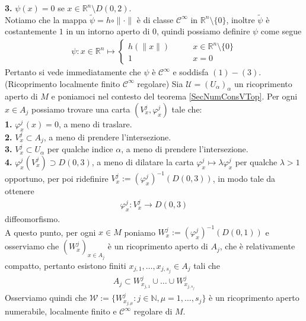 \documentclass[oneside, 11pt]{amsbook}
\makeatletter
\newcommand{\C}{\mathcal{C}}
\newcommand{\U}{\mathcal{U}}
\newcommand{\W}{\mathcal{W}}
\newcommand{\R}{\mathbb{R}}
\newcommand{\vp}{\varphi}
\newcommand{\gr}[1]{\textbf{#1}}
\newcommand{\wt}[1]{{\widetilde{#1}}}
\newcommand{\N}{{\mathbb N}}
\newcommand{\0}{{(0)}}
\newcommand{\3}{{(3)}}
\theoremstyle{colonplain}
\theoremstyle{colondefinition}
\theoremstyle{colonremark}
\numberwithin{equation}{chapter}
\renewcommand{\proofname}{Dimostrazione}
\renewenvironment{proof}[1][\proofname]{\par
  \pushQED{\qed}%
  \normalfont \topsep6\p@\@plus6\p@\relax
  \trivlist
  \item[\hskip\labelsep\bfseries #1:]\ignorespaces
}{%
  \popQED\endtrivlist\@endpefalse
}
\makeatother
\begin{document}
\begin{proof}
    \gr{3.} $\psi(x) = 0$ se $x \in \R^n \setminus D(0, 2)$. \\
    Notiamo che la mappa $\wt{\psi} = h \circ \|\cdot\|$ è di classe $\C^\infty$ in $\R^n \setminus \{0\}$, inoltre $\wt{\psi}$ è costantemente $1$ in un intorno aperto di $0$, quindi possiamo definire $\psi$ come segue
    \begin{align}\label{CutOffFunc}
        \psi : x \in \R^n \mapsto \begin{cases}
            h(\|x\|) &\qquad x \in \R^n \setminus \{0\} \\
            1 &\qquad x = 0
        \end{cases}
    \end{align}
    Pertanto si vede immediatamente che $\psi$ è $\C^\infty$ e soddisfa $(1)-(3)$. \\
    (Ricoprimento localmente finito $\C^\infty$ regolare) Sia $\U = (U_\alpha)_\alpha$ un ricoprimento aperto di $M$ e poniamoci nel contesto del teorema \ref{SecNumConsVTop}. Per ogni $x \in A_j$ possiamo trovare una carta $(V^j_x, \vp^j_x)$ tale che: \\
    \gr{1.} $\vp^j_x(x) = 0$, a meno di traslare. \\
    \gr{2.} $V^j_x \subset A_j$, a meno di prendere l'intersezione. \\
    \gr{3.} $V^j_x \subset U_\alpha$ per qualche indice $\alpha$, a meno di prendere l'intersezione. \\
    \gr{4.} $\vp^j_x(V^j_x) \supset D(0, 3)$, a meno di dilatare la carta $\vp^j_x \mapsto \lambda\vp^j_x$ per qualche $\lambda > 1$ opportuno, per poi ridefinire $V^j_x := (\vp^j_x)^{-1}(D(0, 3))$, in modo tale da ottenere
    \begin{align}
        \vp^j_x : V^j_x \longrightarrow D(0, 3)
    \end{align}
    diffeomorfismo. \\
    A questo punto, per ogni $x \in M$ poniamo $W^j_x := (\vp^j_x)^{-1}(D(0, 1))$ e osserviamo che $(W^j_x)_{x \in A_j}$ è un ricoprimento aperto di $A_j$, che è relativamente compatto, pertanto esistono finiti $x_{j, 1}, \dots, x_{j, s_j} \in A_j$ tali che
    \begin{align}
        A_j \subset W^j_{x_{j, 1}} \cup \dots \cup W^j_{x_{j, s_j}}
    \end{align}
    Osserviamo quindi che $\W := \{W^j_{x_{j, \mu}} : j \in \N, \mu = 1, \dots, s_j\}$ è un ricoprimento aperto numerabile, localmente finito e $\C^\infty$ regolare di $M$. \\

\end{proof}
\end{document}
